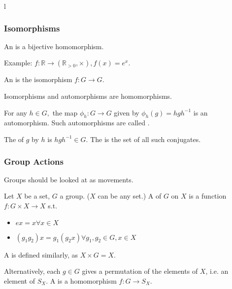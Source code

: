l\documentclass{scrartcl}
\begin{document}
\subsubsection{Isomorphisms}
\begin{definition}
	An  is a bijective homomorphism.
\end{definition}
Example: $f : \mathbb{R} \rightarrow (\mathbb{R}_{>0}, \times), f(x) = e^x$.

\begin{definition}
	An  is the isomorphism $f : G \rightarrow G$.
\end{definition}

Isomorphisms and automorphisms are homomorphisms.

\begin{proposition}
    For any $h\in G,$ the map $\phi_h : G\to G$ given by $\phi_h(g) =hgh^{-1}$ is an automorphism. Such automorphisms are called .
\end{proposition}

\begin{definition}
	The  of $g$ by $h$ is $hgh^{-1} \in G$. The  is the set of all such conjugates.
\end{definition}

\subsubsection{Group Actions}
Groups should be looked at as movements.

\begin{definition}
	Let $X$ be a set, $G$ a group. ($X$ can be any set.) A  of $G$ on $X$ is a function $f : G \times X \rightarrow X$ s.t. 
	\begin{itemize}
		\item $ex = x \forall x \in X$
		\item $(g_1g_2)x = g_1(g_2 x) \forall g_1,g_2 \in G, x \in X$
	\end{itemize}
	A  is defined similarly, as $X \times G = X$.
\end{definition}

\begin{definition}
	Alternatively, each $g \in G$ gives a permutation of the elements of $X$, i.e. an element of $S_X$. A  is a homomorphism $f : G \rightarrow S_X$.
\end{definition}
\end{document}
